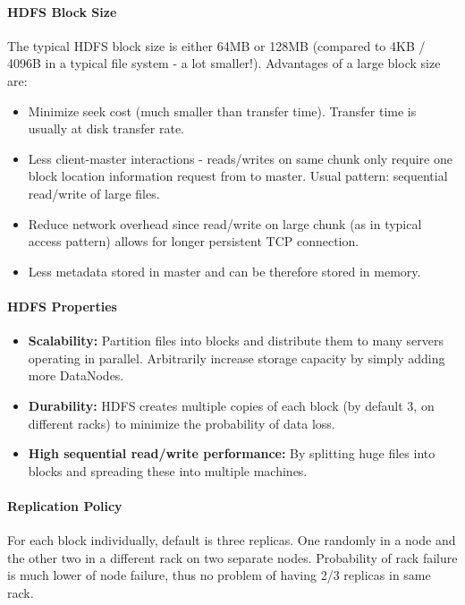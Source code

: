 \paragraph{HDFS Block Size}
The typical HDFS block size is either 64MB or 128MB (compared to 4KB / 4096B in a typical file system - a lot smaller!). Advantages of a large block size are:
\begin{itemize}
    \item Minimize seek cost (much smaller than transfer time). Transfer time is usually at disk transfer rate.
    \item Less client-master interactions - reads/writes on same chunk only require one block location information request from to master. Usual pattern: sequential read/write of large files.
    \item Reduce network overhead since read/write on large chunk (as in typical access pattern) allows for longer persistent TCP connection.
    \item Less metadata stored in master and can be therefore stored in memory.
\end{itemize}

\paragraph{HDFS Properties}
\begin{itemize}
    \item \textbf{Scalability:} Partition files into blocks and distribute them to many servers operating in parallel. Arbitrarily increase storage capacity by simply adding more DataNodes.
    \item \textbf{Durability:} HDFS creates multiple copies of each block (by default 3, on different racks) to minimize the probability of data loss.
    \item \textbf{High sequential read/write performance:} By splitting huge files into blocks and spreading these into multiple machines.
\end{itemize}



\paragraph{Replication Policy}
For each block individually, default is three replicas. One randomly in a node and the other two in a different rack on two separate nodes. Probability of rack failure is much lower of node failure, thus no problem of having 2/3 replicas in same rack.

